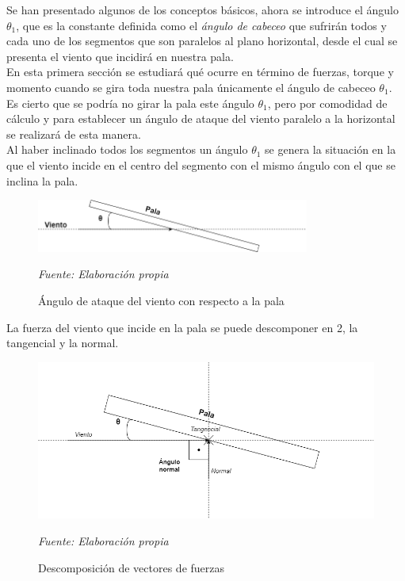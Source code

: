 Se han presentado algunos de los conceptos básicos, ahora se introduce el ángulo $ \theta_1 $, que es la constante definida como el \textit{ángulo de cabeceo} que sufrirán todos y cada uno de los segmentos que son paralelos al plano horizontal, desde el cual se presenta el viento que incidirá en nuestra pala.\\


En esta primera sección se estudiará qué ocurre en término de fuerzas, torque y momento cuando se gira toda nuestra pala únicamente el ángulo de cabeceo $ \theta_1 $. \\


Es cierto que se podría no girar la pala este ángulo $ \theta_1 $, pero por comodidad de cálculo y para establecer un ángulo de ataque del viento paralelo a la horizontal se realizará de esta manera.\\


Al haber inclinado todos los segmentos un ángulo $ \theta_1 $ se genera la situación en la que el viento incide en el centro del segmento con el mismo ángulo con el que se inclina la pala. \\

    \textbf{}
    \begin{figure}[H]
    \centering
    \includegraphics[width=0.8\textwidth]{images/dibujo angulo ataque.drawio.png}
    \caption{Ángulo de ataque del viento con respecto a la pala}
    \textit{Fuente: Elaboración propia}
    \label{fig:dibujo_angulo_ataque}
\end{figure}

La fuerza del viento que incide en la pala se puede descomponer en 2, la tangencial y la normal. \\

    \textbf{}
    \begin{figure}[H]
    \centering
    \includegraphics[width=1\textwidth]{images/dibujo fuerzas.drawio.png}
    \caption{Descomposición de vectores de fuerzas}
    \textit{Fuente: Elaboración propia}
    \label{fig:dibujo_fuerzas}
\end{figure}


